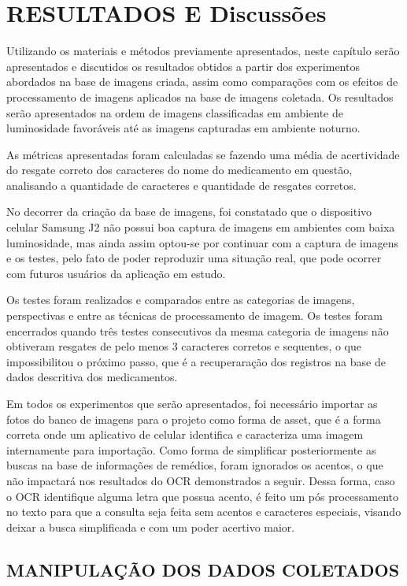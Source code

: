 \chapter{RESULTADOS E Discussões}\label{ch:intro}
Utilizando os materiais e métodos previamente apresentados, neste capítulo serão
apresentados e discutidos os resultados obtidos a partir dos experimentos abordados na base de imagens criada, assim como comparações com os efeitos de processamento de imagens aplicados na base de imagens coletada. Os resultados serão apresentados na ordem de imagens classificadas em ambiente de luminosidade favoráveis até as imagens capturadas em ambiente noturno.


As métricas apresentadas foram calculadas se fazendo uma média de acertividade do resgate correto dos caracteres do nome do medicamento em questão, analisando a quantidade de caracteres e quantidade de resgates corretos.

 No decorrer da criação da base de imagens, foi constatado que o dispositivo celular Samsung J2  não possui boa captura de imagens em ambientes com baixa luminosidade, mas ainda assim optou-se por continuar com a captura de imagens e os testes, pelo fato de poder reproduzir uma situação real, que pode ocorrer com futuros usuários da aplicação em estudo.
 
Os testes foram realizados e comparados entre as categorias de imagens, perspectivas e entre as técnicas de processamento de imagem. Os testes foram encerrados quando três testes consecutivos da mesma categoria de imagens não obtiveram resgates de pelo menos 3 caracteres corretos e sequentes, o que impossibilitou o próximo passo, que é a recuperaração dos registros na base de dados descritiva dos medicamentos.

Em todos os experimentos que serão apresentados, foi necessário importar as fotos do banco de imagens para o projeto como forma de asset, que é a forma correta onde um aplicativo de celular identifica e caracteriza uma imagem internamente para importação. Como forma de simplificar posteriormente as buscas na base de informações de remédios, foram ignorados os acentos, o que não impactará nos resultados do OCR demonstrados a seguir. Dessa forma, caso o OCR identifique alguma letra que possua acento, é feito um pós processamento no texto para que a consulta seja feita sem acentos e caracteres especiais, visando deixar a busca simplificada e com um poder acertivo maior.

\section{MANIPULAÇÃO DOS DADOS COLETADOS}

